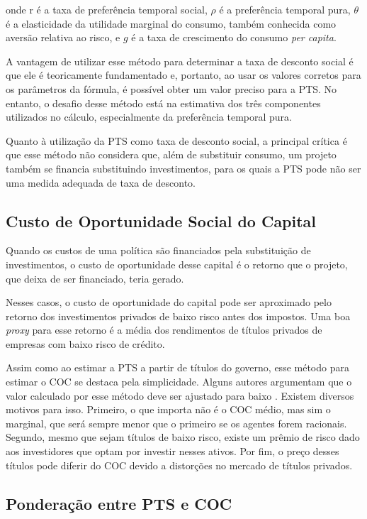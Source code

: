 \documentclass[12pt,letterpaper]{article}
\newcommand{\1}{\mathbbm{1}}
\numberwithin{equation}{section}
\begin{document}
\noindent onde r é a taxa de preferência temporal social, $\rho$ é a preferência temporal pura, $\theta$ é a elasticidade da utilidade marginal do consumo, também conhecida como aversão relativa ao risco, e $g$ é a taxa de crescimento do consumo \textit{per capita}.

A vantagem de utilizar esse método para determinar a taxa de desconto social é que ele é teoricamente fundamentado e, portanto, ao usar os valores corretos para os parâmetros da fórmula, é possível obter um valor preciso para a PTS. No entanto, o desafio desse método está na estimativa dos três componentes utilizados no cálculo, especialmente da preferência temporal pura.

Quanto à utilização da PTS como taxa de desconto social, a principal crítica é que esse método não considera que, além de substituir consumo, um projeto também se financia substituindo investimentos, para os quais a PTS pode não ser uma medida adequada de taxa de desconto.

\subsection{Custo de Oportunidade Social do Capital}

Quando os custos de uma política são financiados pela substituição de investimentos, o custo de oportunidade desse capital é o retorno que o projeto, que deixa de ser financiado, teria gerado.

Nesses casos, o custo de oportunidade do capital pode ser aproximado pelo retorno dos investimentos privados de baixo risco antes dos impostos. Uma boa \textit{proxy} para esse retorno é a média dos rendimentos de títulos privados de empresas com baixo risco de crédito.

Assim como ao estimar a PTS a partir de títulos do governo, esse método para estimar o COC se destaca pela simplicidade. Alguns autores argumentam que o valor calculado por esse método deve ser ajustado para baixo \cite{Lind1982primer,boardman_cost-benefit_2018}. Existem diversos motivos para isso. Primeiro, o que importa não é o COC médio, mas sim o marginal, que será sempre menor que o primeiro se os agentes forem racionais. Segundo, mesmo que sejam títulos de baixo risco, existe um prêmio de risco dado aos investidores que optam por investir nesses ativos. Por fim, o preço desses títulos pode diferir do COC devido a distorções no mercado de títulos privados.

\subsection{Ponderação entre PTS e COC}
\end{document}

